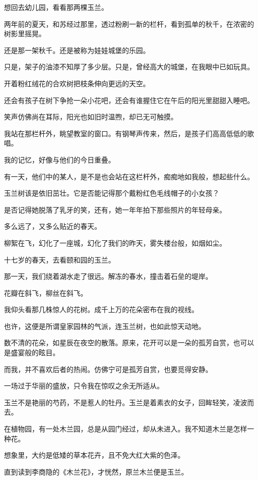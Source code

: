 \documentclass[12pt,a4paper]{article}
\def\blankrev{\vspace{1ex}}									%
\begin{document}
		\blankrev
		想回去幼儿园，看看那两棵玉兰。\par
		两年前的夏天，和苏经过那里，透过粉刷一新的栏杆，看到孤单的秋千，在浓密的树影里摇晃。\par
		还是那一架秋千。还是被称为娃娃城堡的乐园。\par
		只是，架子的油漆不知厚了多少层。只是，曾经高大的城堡，在我眼中已如玩具。\par
		开着粉红绒花的合欢树把枝条伸向更远的天空。\par
		还会有孩子在树下争抢一朵小花吧，还会有谁握住它在午后的阳光里甜甜入睡吧。\par
		笑声仿佛尚在耳际，阳光也如旧时温煦，却已无可触摸。\par
		我站在那栏杆外，眺望教室的窗口。有钢琴声传来，然后，是孩子们高高低低的歌唱。\par
		我的记忆，好像与他们的今日重叠。\par
		有一天，他们中的某人，是不是也会站在这栏杆外，痴痴地如我般，想起些什么。\par
		玉兰树该是依旧茁壮。它是否能记得那个戴粉红色毛线帽子的小女孩？\par
		是否记得她脱落了乳牙的笑，还有，她一年年拍下那些照片的年轻母亲。\par
		多么远了，又多么贴近的春天。\par
		柳絮在飞，幻化了一座城，幻化了我们的昨天，雾失楼台般，如烟如尘。

		\blankrev
		十七岁的春天，去看颐和园的玉兰。\par
		那一天，我们绕着湖水走了很远。解冻的春水，撞击着石垒的堤岸。\par
		花瓣在斜飞，柳丝在斜飞。\par
		我仰头看那几株惊人的花树。成千上万的花朵密布在我的视线。\par
		也许，这便是所谓皇家园林的气派，连玉兰树，也如此惊天动地。\par
		数不清的花朵，如星辰在夜空的散落。原来，花开可以是一朵的孤芳自赏，也可以是盛宴般的眩目。\par
		而我，并不喜欢后者的热闹。仿佛宁可是孤芳自赏，也要觅得安静。\par
		一场过于华丽的盛放，只令我在惊叹之余无所适从。\par
		玉兰不是艳丽的芍药，不是惹人的牡丹。玉兰是着素衣的女子，回眸轻笑，凌波而去。\par
		在植物园，有一处木兰园，总是从园门经过，却从未进入。我不知道木兰是怎样一种花。\par
		想象里，大约是低矮的草本花卉，且不免大红大紫的色泽。\par
		直到读到李商隐的《木兰花》，才恍然，原兰木兰便是玉兰。
\end{document}
